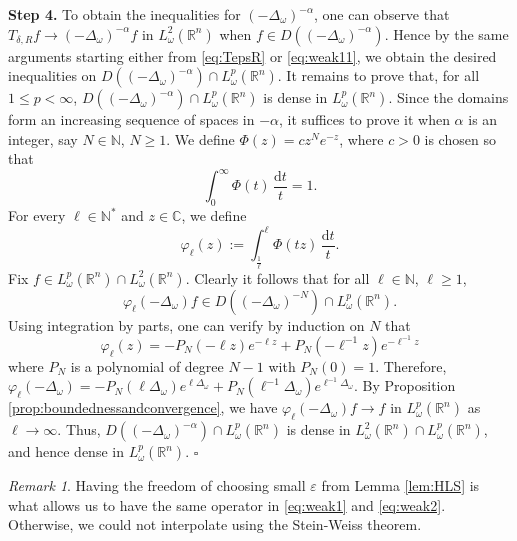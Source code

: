 \documentclass[12pt, letterpaper]{amsart}
\theoremstyle{definition}
\theoremstyle{remark}
\newtheorem{rem}[thm]{Remark}
\numberwithin{equation}{section}
\begin{document}
{    \noindent\textbf{Step 4.} To obtain the inequalities for $(-\Delta_\omega)^{-\alpha}$, one can observe that  $T_{\delta,R}f \to (-\Delta_\omega)^{-\alpha} f  $ in $L^2_\omega(\mathbb{R}^n)$ when $f\in D((-\Delta_\omega)^{-\alpha})$. Hence by the same  arguments starting either from \eqref{eq:TepsR} or \eqref{eq:weak11}, we obtain the desired inequalities on  $D((-\Delta_\omega)^{-\alpha}) \cap L^p_\omega(\mathbb{R}^n)$. It remains to prove that, for all $1\le p <\infty$,  $D((-\Delta_\omega)^{-\alpha}) \cap L^p_\omega(\mathbb{R}^n)$ is dense in $L^p_\omega(\mathbb{R}^n)$. Since the domains form an increasing sequence of spaces in $-\alpha$, it suffices to prove it when  $\alpha$ is an integer, say $N\in \mathbb{N}$, $N\ge 1$. We define $\Phi(z) = c z^N e^{-z}$, where %
    $c > 0$ is chosen so that
$$
\int_0^{\infty}  \Phi(t) \, \frac{\mathrm{d}t}{t} = 1.
$$
For every $\ell\in  \mathbb{N}^*$ and $z \in \mathbb{C}$, we define
$$
\varphi_\ell(z) := \int_{\frac{1}{\ell}}^\ell  \Phi(tz) \, \frac{\mathrm{d}t}{t}.
$$
Fix $f \in L^p_\omega(\mathbb{R}^n) \cap L^2_\omega(\mathbb{R}^n)$. Clearly it follows that for all $\ell\in  \mathbb{N}$, $\ell\ge 1$,
$$
\varphi_\ell(-\Delta_\omega) f \in D((-\Delta_\omega)^{-N}) \cap L^p_\omega(\mathbb{R}^n).
$$
Using integration by parts, one can verify by induction on $N$ that 
$$\varphi_\ell(z)=-P_N(-\ell z)e^{-\ell z}+ P_N(-\ell^{-1}z)e^{-\ell^{-1} z}$$ where $P_N$  is a polynomial of degree $N-1$ with $P_N(0)=1$. Therefore,   $\varphi_\ell(-\Delta_\omega)=-P_N (\ell \Delta_\omega) e^{\ell \Delta_\omega}+P_N (\ell^{-1} \Delta_\omega) e^{{\ell}^{-1} \Delta_\omega}$.
By Proposition \ref{prop:boundednessandconvergence}, we have $\varphi_\ell(-\Delta_\omega) f \to f$  in $L^p_\omega(\mathbb{R}^n)$ as $\ell \to \infty$. Thus, $D((-\Delta_\omega)^{-\alpha}) \cap L^p_\omega(\mathbb{R}^n)$ is dense in $L^2_\omega(\mathbb{R}^n) \cap L^p_\omega(\mathbb{R}^n)$, and hence dense in $L^p_\omega(\mathbb{R}^n)$. \hspace{2.5cm} $\square$
    



\begin{rem}
    Having the freedom of choosing small $\varepsilon$ from Lemma \ref{lem:HLS} is what allows us to have the same operator in \eqref{eq:weak1} and \eqref{eq:weak2}. Otherwise, we could not interpolate using  the Stein-Weiss theorem.
\end{rem}






}
\end{document}
